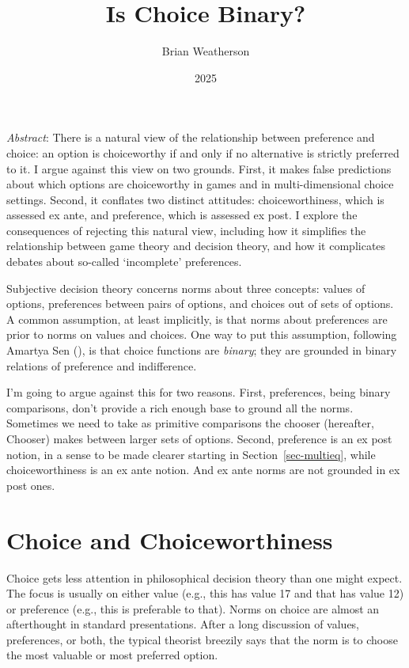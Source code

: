 \documentclass[
  11pt,
  letterpaper,
  DIV=11,
  numbers=noendperiod,
  twoside]{scrartcl}
\title{Is Choice Binary?}
\author{Brian Weatherson}
\date{2025}
\renewenvironment{abstract}
 {\vspace{-1.25cm}
 \quotation\small\noindent\emph{Abstract}:}
 {\endquotation}
\begin{document}
\maketitle
\begin{abstract}
There is a natural view of the relationship between preference and
choice: an option is choiceworthy if and only if no alternative is
strictly preferred to it. I argue against this view on two grounds.
First, it makes false predictions about which options are choiceworthy
in games and in multi-dimensional choice settings. Second, it conflates
two distinct attitudes: choiceworthiness, which is assessed ex ante, and
preference, which is assessed ex post. I explore the consequences of
rejecting this natural view, including how it simplifies the
relationship between game theory and decision theory, and how it
complicates debates about so-called `incomplete' preferences.
\end{abstract}


Subjective decision theory concerns norms about three concepts: values
of options, preferences between pairs of options, and choices out of
sets of options. A common assumption, at least implicitly, is that norms
about preferences are prior to norms on values and choices. One way to
put this assumption, following Amartya Sen
(), is that choice functions
are \emph{binary}; they are grounded in binary relations of preference
and indifference.

I'm going to argue against this for two reasons. First, preferences,
being binary comparisons, don't provide a rich enough base to ground all
the norms. Sometimes we need to take as primitive comparisons the
chooser (hereafter, Chooser) makes between larger sets of options.
Second, preference is an ex post notion, in a sense to be made clearer
starting in Section~\ref{sec-multieq}, while choiceworthiness is an ex
ante notion. And ex ante norms are not grounded in ex post ones.

\section{Choice and Choiceworthiness}\label{sec-choice}

Choice gets less attention in philosophical decision theory than one
might expect. The focus is usually on either value (e.g., this has value
17 and that has value 12) or preference (e.g., this is preferable to
that). Norms on choice are almost an afterthought in standard
presentations. After a long discussion of values, preferences, or both,
the typical theorist breezily says that the norm is to choose the most
valuable or most preferred option.
\end{document}
